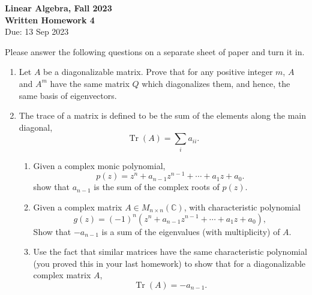 \documentclass[11 pt]{article}
\DeclareMathOperator\tr{Tr}
\newcommand{\C}{\mathbb{C}}
\begin{document}
\onehalfspacing
\begin{center}
\textbf{{\Large Linear Algebra, Fall 2023}\\
Written Homework 4}\\
Due: 13 Sep 2023
\end{center}

\noindent Please answer the following questions on a separate sheet of paper and turn it in.

\begin{enumerate}
\item Let $A$ be a diagonalizable matrix. Prove that for any positive integer $m$, $A$ and $A^m$ have the same matrix $Q$ which diagonalizes them, and hence, the same basis of eigenvectors.

\item The trace of a matrix is defined to be the sum of the elements along the main diagonal, 
\[\tr(A) = \sum_i a_{ii}.\]
    \begin{enumerate}
    \item Given a complex monic polynomial,
    \[p(z) = z^n + a_{n-1}z^{n-1} + \cdots + a_1 z + a_0.\] show that $a_{n-1}$ is the sum of the complex roots of $p(z)$.
    \item Given a complex matrix $A \in M_{n\times n}(\C)$, with characteristic polynomial 
    \[g(z) = (-1)^n(z^n + a_{n-1}z^{n-1} + \cdots + a_1 z + a_0),\] Show that $-a_{n-1}$ is a sum of the eigenvalues (with multiplicity) of $A$.
    \item Use the fact that similar matrices have the same characteristic polynomial (you proved this in your last homework) to show that for a diagonalizable complex matrix $A$, 
    \[\tr(A) = -a_{n-1}.\]
    \end{enumerate}


\end{enumerate}
\end{document}
